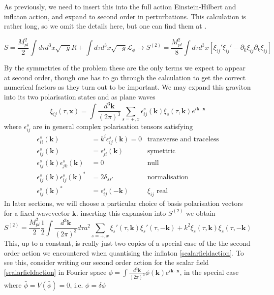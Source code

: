 \documentclass[a4paper,10pt]{article}
\renewcommand{\v}[1]{\mathbf{#1}}
\newcommand{\Mp}{M_{pl}}
\newcommand{\half}{\frac{1}{2}}
\newcommand{\bphi}{\bar{\phi}}
\newcommand{\fint}[1]{\int \frac{d^3 \v{#1}}{(2\pi)^3}}
\begin{document}
As previously, we need to insert this into the full action Einstein-Hilbert and inflaton action, and expand to second order in perturbations. This calculation is rather long, so we omit the details here, but one can find them at \cite{wang}. 

\begin{equation}
S=\frac{\Mp^2}{2} \int d\tau d^3x \sqrt{-g}R + \int d\tau d^3x \sqrt{-g}\mathcal{L}_\phi \rightarrow S^{(2)} = \frac{\Mp^2}{8}\int d\tau d^3x [\xi_{ij}'\xi_{ij}'-\partial_k\xi_{ij}\partial_k\xi_{ij}]
\end{equation}

By the symmetries of the problem these are the only terms we expect to appear at second order, though one has to go through the calculation to get the correct numerical factors as they turn out to be important. We may expand this graviton into its two polarisation states and as plane waves \cite{pajer}
\begin{equation}
\xi_{ij}(\tau, \v{x}) = \fint{k} \sum_{s=+,x} \epsilon_{ij}^s(\v{k})\xi_s(\tau,\v{k})e^{i\v{k}\cdot\v{x}}
\end{equation}
where $\epsilon_{ij}^s$ are in general complex polarisation tensors satisfying
\begin{align}
\epsilon_{ii}^s(\v{k}) &= k^i \epsilon_{ij}^s(\v{k}) = 0 &\text{transverse and traceless}\\
\label{polarisation1}
\epsilon_{ij}^s(\v{k}) &= \epsilon_{ji}^s(\v{k}) &\text{symettric}\\
\epsilon_{ij}^s(\v{k})\epsilon_{jk}^s(\v{k}) &= 0&\text{null}\\
\epsilon_{ij}^s(\v{k})\epsilon_{ij}^s(\v{k})^* &= 2\delta_{ss'} &\text{normalisation}\\
\epsilon_{ij}^s(\v{k})^* &= \epsilon_{ij}^s(\v{-k})&\text{$\xi_{ij}$ real}
\label{polarisation2}
\end{align}
In later sections, we will choose a particular choice of basis polarisation vectors for a fixed wavevector $\v{k}$. inserting this expansion into $S^{(2)}$ we obtain 
\begin{equation}
S^{(2)} = \frac{\Mp^2}{2} \half \fint{k} d\tau a^2 \sum_{s=+,x} \xi_s'(\tau,\v{k})\xi_s '(\tau,\v{-k})+k^2 \xi_s(\tau,\v{k})\xi_s (\tau,\v{-k})
\label{gravwaveaction}
\end{equation}
This, up to a constant, is really just two copies of a special case of the the second order action we encountered when quantising the inflaton \ref{scalarfieldaction}. To see this, consider writing our second order action for the scalar field \ref{scalarfieldaction} in Fourier space $\phi = \fint{k} \phi(\v{k})e^{i\v{k}\cdot\v{x}}$, in the special case where $\bphi = V(\bphi) = 0$, i.e. $\phi = \delta \phi$
\end{document}
